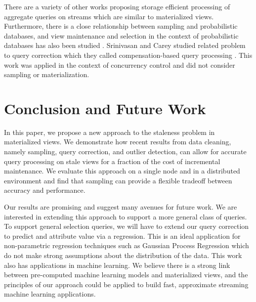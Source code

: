 There are a variety of other works proposing storage efficient processing of aggregate queries on streams \cite{dobra2002processing, greenwald2001space} which are similar to materialized views. Furthermore, there is a close relationship between sampling and probabilistic databases, and view maintenance and selection in the context of probabilistic databases has also been studied \cite{re2007materialized}.
Srinivasan and Carey studied related problem to query correction which they called compensation-based query processing \cite{srinivasanC92}.
This work was applied in the context of concurrency control and did not consider sampling or materialization.

\section{Conclusion and Future Work}\label{conclusion}
In this paper, we propose a new approach to the staleness problem in materialized views.
We demonstrate how recent results from data cleaning, namely sampling, query correction, and outlier detection, can
allow for accurate query processing on stale views for a fraction of the cost of incremental maintenance. 
We evaluate this approach on a single node and in a distributed environment and find that sampling can provide a flexible tradeoff 
between accuracy and performance.

Our results are promising and suggest many avenues for future work.
We are interested in extending this approach to support a more general class of queries.
To support general selection queries, we will have to extend our query correction to predict and attribute value via a regression.
This is an ideal application for non-parametric regression techniques such as Gaussian Process Regression which do
not make strong assumptions about the distribution of the data.
This work also has applications in machine learning.
We believe there is a strong link between pre-computed machine learning models and materialized views, and the principles of our approach could be applied
to build fast, approximate streaming machine learning applications.



